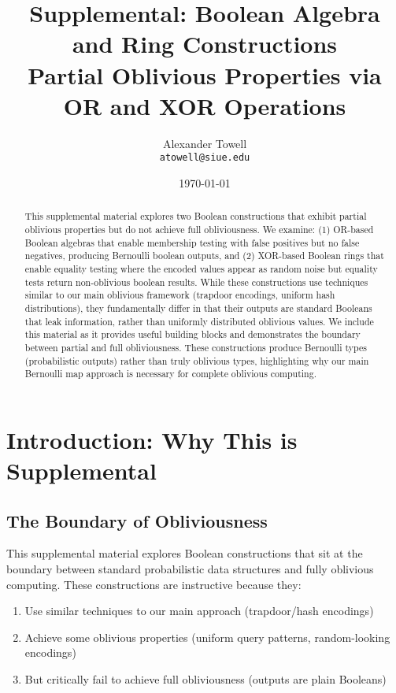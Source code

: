 \documentclass[11pt,final]{article}
\title{Supplemental: Boolean Algebra and Ring Constructions\\\small{Partial Oblivious Properties via OR and XOR Operations}}
\author{
    Alexander Towell\\
    \texttt{atowell@siue.edu}
}
\date{\today}
\begin{document}
\maketitle

\begin{abstract}
This supplemental material explores two Boolean constructions that exhibit partial oblivious properties but do not achieve full obliviousness. We examine: (1) OR-based Boolean algebras that enable membership testing with false positives but no false negatives, producing Bernoulli boolean outputs, and (2) XOR-based Boolean rings that enable equality testing where the encoded values appear as random noise but equality tests return non-oblivious boolean results. While these constructions use techniques similar to our main oblivious framework (trapdoor encodings, uniform hash distributions), they fundamentally differ in that their outputs are standard Booleans that leak information, rather than uniformly distributed oblivious values. We include this material as it provides useful building blocks and demonstrates the boundary between partial and full obliviousness. These constructions produce Bernoulli types (probabilistic outputs) rather than truly oblivious types, highlighting why our main Bernoulli map approach is necessary for complete oblivious computing.
\end{abstract}


\ObliviousNotationGuide

\section{Introduction: Why This is Supplemental}

\subsection{The Boundary of Obliviousness}

This supplemental material explores Boolean constructions that sit at the boundary between standard probabilistic data structures and fully oblivious computing. These constructions are instructive because they:

\begin{enumerate}
    \item Use similar techniques to our main approach (trapdoor/hash encodings)
    \item Achieve some oblivious properties (uniform query patterns, random-looking encodings)
    \item But critically fail to achieve full obliviousness (outputs are plain Booleans)
\end{enumerate}
\end{document}
